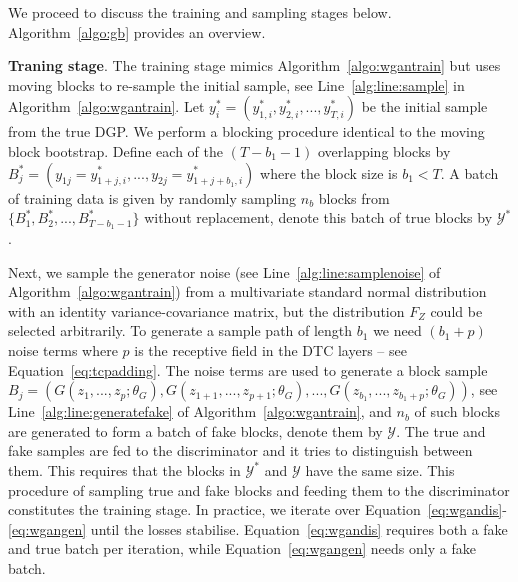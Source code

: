 \documentclass[12pt]{article}
\begin{document}
We proceed to discuss the training and sampling stages below. Algorithm~\ref{algo:gb} provides an overview.


\textbf{Traning stage}. The training stage mimics Algorithm~\ref{algo:wgantrain} but uses moving blocks to re-sample the initial sample, see Line~\ref{alg:line:sample} in Algorithm~\ref{algo:wgantrain}. Let $y^*_i = (y^*_{1,i}, y^*_{2,i}, ..., y^*_{T,i})$ be the initial sample from the true DGP. We perform a blocking procedure identical to the moving block bootstrap. Define each of the $(T - b_1 - 1)$ overlapping blocks by $B^*_j = (y_{1j} = y^*_{1+j,i}, ..., y_{2j} = y^*_{1+j+b_1,i})$ where the block size is $b_1 < T$. A batch of training data is given by randomly sampling $n_b$ blocks from $\{ B^*_1, B^*_2, ..., B^*_{T - b_1 - 1} \}$ without replacement, denote this batch of true blocks by $\mathcal{Y}^*$. 

Next, we sample the generator noise (see Line~\ref{alg:line:samplenoise} of Algorithm~\ref{algo:wgantrain}) from a multivariate standard normal distribution with an identity variance-covariance matrix, but the distribution $F_Z$ could be selected arbitrarily. To generate a sample path of length $b_1$ we need $(b_1 + p)$ noise terms where $p$ is the receptive field in the DTC layers -- see Equation~\ref{eq:tcpadding}. The noise terms are used to generate a block sample $B_{j} = (G(z_1, ..., z_p; \theta_G), G(z_{1+1}, ..., z_{p+1}; \theta_G), ..., \allowbreak G(z_{b_1}, ..., z_{b_1+p}; \theta_G))$, see Line~\ref{alg:line:generatefake} of Algorithm~\ref{algo:wgantrain}, and $n_b$ of such blocks are generated to form a batch of fake blocks, denote them by $\mathcal{Y}$. The true and fake samples are fed to the discriminator and it tries to distinguish between them. This requires that the blocks in $\mathcal{Y}^*$ and $\mathcal{Y}$ have the same size. This procedure of sampling true and fake blocks and feeding them to the discriminator constitutes the training stage. In practice, we iterate over Equation~\ref{eq:wgandis}-\ref{eq:wgangen} until the losses stabilise. Equation~\ref{eq:wgandis} requires both a fake and true batch per iteration, while Equation~\ref{eq:wgangen} needs only a fake batch.
\end{document}
